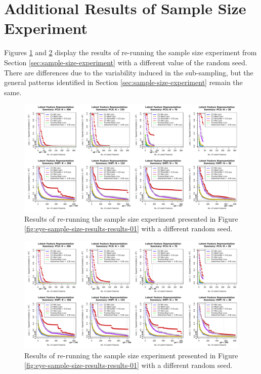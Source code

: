 \section{Additional Results of Sample Size Experiment}\label{sec:additional-results}

Figures \ref{fig:eye-sample-size-results-results-02} and \ref{fig:eye-sample-size-results-results-03} display the results of re-running the sample size experiment from Section \ref{sec:sample-size-experiment} with a different value of the random seed.
There are differences due to the variability induced in the sub-sampling, but the general patterns identified in Section \ref{sec:sample-size-experiment} remain the same.

\begin{figure}
    \centering
    \includegraphics[width=1\linewidth]{figures/eye-sample-size-results-results-real-02.pdf}
    \caption{Results of re-running the sample size experiment presented in Figure \ref{fig:eye-sample-size-results-results-01} with a different random seed.}
    \label{fig:eye-sample-size-results-results-02}
\end{figure}

\begin{figure}
    \centering
    \includegraphics[width=1\linewidth]{figures/eye-sample-size-results-results-real-03.pdf}
    \caption{Results of re-running the sample size experiment presented in Figure \ref{fig:eye-sample-size-results-results-01} with a different random seed.}
    \label{fig:eye-sample-size-results-results-03}
\end{figure}